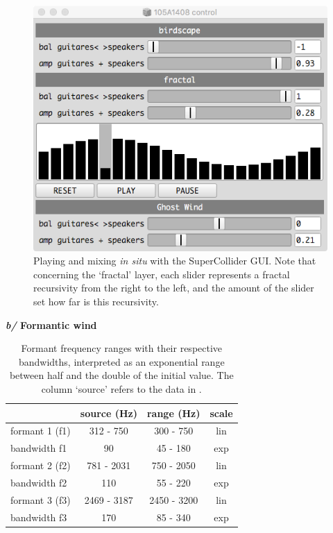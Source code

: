 \begin{figure}[hbt]
\begin{center}
	\includegraphics[scale=0.55]{img/9809}		
\caption{Playing and mixing \textit{in situ} with the SuperCollider GUI. Note that concerning the `fractal' layer, each slider represents a fractal recursivity from the right to the left, and the amount of the slider set how far is this recursivity.}
\label{hk}
\end{center}
\end{figure}

  \textbf{\textit{b/} Formantic wind}
  
  \smallskip
  
  \begin{table}[htp]
\begin{center}
{\ttfamily
\begin{tabular}{|l|c|c|c|}
\cline{2-4}
    \multicolumn{1}{c|}{} & source (Hz) & range (Hz) & scale \\ 
    \hline 
    formant 1 (f1) & 312 - 750 & 300 - 750 & lin \\ 
 \hline
 bandwidth f1 & 90 & 45 - 180 & exp \\ 
 \hline
 formant 2 (f2) & 781 - 2031 & 750 - 2050 & lin \\ 
 \hline
 bandwidth f2 & 110 & 55 - 220 & exp \\ 
 \hline
 formant 3 (f3) & 2469 - 3187 & 2450 - 3200 & lin \\ 
 \hline
 bandwidth f3 & 170 & 85 - 340 & exp \\ 
 \hline
\end{tabular}}
\caption{Formant frequency ranges with their respective bandwidths, interpreted as an exponential range between half and the double of the initial value. The column `source' refers to the data in \citep{adc}.}
\end{center}
\label{default}
\end{table}%

	
	
	
	
